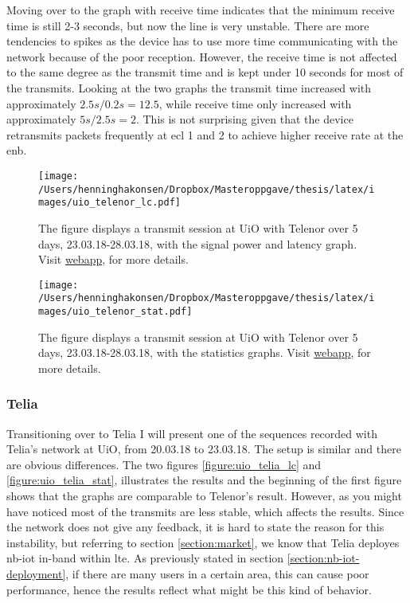 \documentclass[USenglish]{ifimaster}  %
\begin{document}
Moving over to the graph with receive time indicates that the minimum receive time is still 2-3 seconds, but now the line is very unstable. There are more tendencies to spikes as the device has to use more time communicating with the network because of the poor reception. However, the receive time is not affected to the same degree as the transmit time and is kept under 10 seconds for most of the transmits. Looking at the two graphs the transmit time increased with approximately ${2.5s / 0.2s = 12.5}$, while receive time only increased with approximately ${5s / 2.5s = 2}$. This is not surprising given that the device retransmits packets frequently at \acrshort{ecl} 1 and 2 to achieve higher receive rate at the \acrshort{enb}.

\begin{figure}[H]
  \centering
  \texttt{[image: /Users/henninghakonsen/Dropbox/Masteroppgave/thesis/latex/images/uio\_telenor\_lc.pdf]}
  \caption[Long-term test - Telenor 23.03.18-28.03.18, signal power and latency]{The figure displays a transmit session at UiO with Telenor over 5 days, 23.03.18-28.03.18, with the signal power and latency graph. Visit \href{http://158.39.77.97:9000/\#/nodes/id2}{webapp}, for more details.}
  \label{figure:uio_telenor_lc}
\end{figure}

\begin{figure}[H]
  \centering
  \texttt{[image: /Users/henninghakonsen/Dropbox/Masteroppgave/thesis/latex/images/uio\_telenor\_stat.pdf]}
  \caption[Long-term test - Telenor 23.03.18-28.03.18, statistics]{The figure displays a transmit session at UiO with Telenor over 5 days, 23.03.18-28.03.18, with the statistics graphs. Visit \href{http://158.39.77.97:9000/\#/nodes/id2}{webapp}, for more details.}
  \label{figure:uio_telenor_stat}
\end{figure}

\subsubsection{Telia}
Transitioning over to Telia I will present one of the sequences recorded with Telia's network at UiO, from 20.03.18 to 23.03.18. The setup is similar and there are obvious differences. The two figures \vref{figure:uio_telia_lc} and \vref{figure:uio_telia_stat}, illustrates the results and the beginning of the first figure shows that the graphs are comparable to Telenor's result. However, as you might have noticed most of the transmits are less stable, which affects the results. Since the network does not give any feedback, it is hard to state the reason for this instability, but referring to section \vref{section:market}, we know that Telia deployes \acrshort{nb-iot} in-band within \acrshort{lte}. As previously stated in section \vref{section:nb-iot-deployment}, if there are many users in a certain area, this can cause poor performance, hence the results reflect what might be this kind of behavior.
\end{document}

